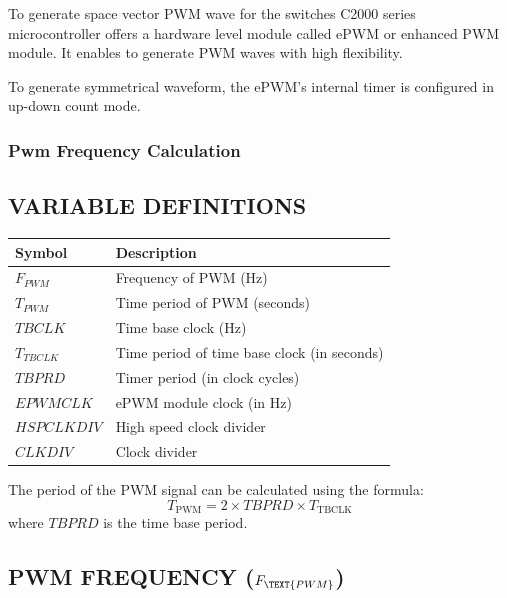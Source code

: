 To generate space vector PWM wave for the switches C2000 series microcontroller offers a hardware level module called ePWM or enhanced PWM module. It enables to generate PWM waves with high flexibility.

To generate symmetrical waveform, the ePWM's internal timer is configured in up-down count mode.

\subsubsection{Pwm Frequency Calculation}

\subsection*{VARIABLE DEFINITIONS}

\renewcommand{\arraystretch}{1.5}
\begin{tabular}{|>{\bfseries}l|l|}
	\hline
	Symbol      & Description                                 \\ \hline
	$F_{PWM}$   & Frequency of PWM (Hz)                       \\ \hline
	$T_{PWM}$   & Time period of PWM (seconds)                \\ \hline
	$TBCLK$     & Time base clock (Hz)                        \\ \hline
	$T_{TBCLK}$ & Time period of time base clock (in seconds) \\ \hline
	$TBPRD$     & Timer period (in clock cycles)              \\ \hline
	$EPWMCLK$   & ePWM module clock (in Hz)                   \\ \hline
	$HSPCLKDIV$ & High speed clock divider                    \\ \hline
	$CLKDIV$    & Clock divider                               \\ \hline
\end{tabular}

\vspace{0.2in}

The period of the PWM signal can be calculated using the formula:
\[
	T_{\text{PWM}} = 2 \times TBPRD \times T_{\text{TBCLK}}
\]
where \( TBPRD \) is the time base period.

\subsection{PWM FREQUENCY (\( F_{\TEXT{PWM}} \))}


